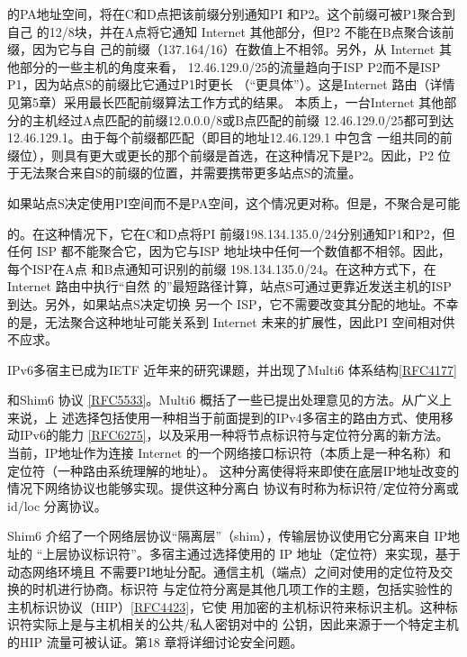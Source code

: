 的PA地址空间，将在C和D点把该前缀分别通知PI 和P2。这个前缀可被P1聚合到自己
的12/8块，并在A点将它通知 Internet 其他部分，但P2 不能在B点聚合该前缀，因为它与自
己的前缀（137.164/16）在数值上不相邻。另外，从 Internet 其他部分的一些主机的角度来看，
12.46.129.0/25的流量趋向于ISP P2而不是ISP P1，因为站点S的前缀比它通过P1时更长
（“更具体”）。这是Internet 路由（详情见第5章）采用最长匹配前缀算法工作方式的结果。
本质上，一台Internet 其他部分的主机经过A点匹配的前缀12.0.0.0/8或B点匹配的前缀
12.46.129.0/25都可到达12.46.129.1。由于每个前缀都匹配（即目的地址12.46.129.1 中包含
一组共同的前缀位），则具有更大或更长的那个前缀是首选，在这种情况下是P2。因此，P2
位于无法聚合来自S的前缀的位置，并需要携带更多站点S的流量。

如果站点S决定使用PI空间而不是PA空间，这个情况更对称。但是，不聚合是可能

的。在这种情况下，它在C和D点将PI 前缀198.134.135.0/24分别通知P1和P2，但任何
ISP 都不能聚合它，因为它与ISP 地址块中任何一个数值都不相邻。因此，每个ISP在A点
和B点通知可识别的前缀 198.134.135.0/24。在这种方式下，在Internet 路由中执行“自然
的”最短路径计算，站点S可通过更靠近发送主机的ISP 到达。另外，如果站点S决定切换
另一个 ISP，它不需要改变其分配的地址。不幸的是，无法聚合这种地址可能关系到 Internet
未来的扩展性，因此PI 空间相对供不应求。

IPv6多宿主已成为IETF 近年来的研究课题，并出现了Multi6 体系结构\href{https://www.rfc-editor.org/rfc/rfc4177}{[RFC4177]}

和Shim6 协议 \href{https://www.rfc-editor.org/rfc/rfc5533}{[RFC5533]}。Multi6 概括了一些已提出处理意见的方法。从广义上来说，上
述选择包括使用一种相当于前面提到的IPv4多宿主的路由方式、使用移动IPv6的能力
\href{https://www.rfc-editor.org/rfc/rfc6275}{[RFC6275]}，以及采用一种将节点标识符与定位符分离的新方法。当前，IP地址作为连接
Internet 的一个网络接口标识符（本质上是一种名称）和定位符（一种路由系统理解的地址）。
这种分离使得将来即使在底层IP地址改变的情况下网络协议也能够实现。提供这种分离白
协议有时称为标识符/定位符分离或id/loc 分离协议。

Shim6 介绍了一个网络层协议“隔离层”（shim），传输层协议使用它分离来自 IP地址的
“上层协议标识符”。多宿主通过选择使用的 IP 地址（定位符）来实现，基于动态网络环境且
不需要PI地址分配。通信主机（端点）之间对使用的定位符及交换的时机进行协商。标识符
与定位符分离是其他几项工作的主题，包括实验性的主机标识协议（HIP）\href{https://www.rfc-editor.org/rfc/rfc4423}{[RFC4423]}，它使
用加密的主机标识符来标识主机。这种标识符实际上是与主机相关的公共/私人密钥对中的
公钥，因此来源于一个特定主机的HIP 流量可被认证。第18 章将详细讨论安全问题。

